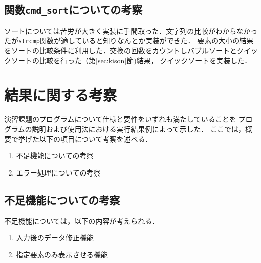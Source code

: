 \documentclass[a4j,11pt]{jarticle}
\begin{document}
\subsection{関数\texttt{cmd\_sort}についての考察}
ソートについては苦労が大きく実装に手間取った．文字列の比較がわからなかったが\verb|strcmp|関数が適していると知りなんとか実装ができた．
要素の大小の結果をソートの比較条件に利用した．交換の回数をカウントしバブルソートとクイックソートの比較を行った（第\ref{sec:kison}節)結果，
クイックソートを実装した．

\section{結果に関する考察}


演習課題のプログラムについて仕様と要件をいずれも満たしていることを
プログラムの説明および使用法における実行結果例によって示した．
ここでは，概要で挙げた以下の項目について考察を述べる．

\begin{enumerate}
\setlength{\parskip}{2pt} \setlength{\itemsep}{2pt}
    \item 不足機能についての考察
    \item エラー処理についての考察
\end{enumerate}

\subsection{不足機能についての考察}
不足機能については，以下の内容が考えられる．
\begin{enumerate}
\setlength{\parskip}{2pt} \setlength{\itemsep}{2pt}
   \item 入力後のデータ修正機能
   \item 指定要素のみ表示させる機能 
\end{enumerate}
\end{document}
